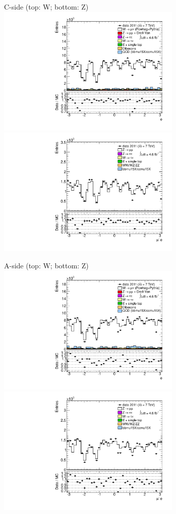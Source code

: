 {

\colb[T]

C-side (top: W; bottom: Z)
\centering
\includegraphics[width=0.66\textwidth]{dates/20130306/figures/etaphi/W_2_C_stack_l_phi_NEG} \\
\includegraphics[width=0.66\textwidth]{dates/20130306/figures/etaphi/Z_2_C_stack_lN_phi_ALL.pdf}

A-side (top: W; bottom: Z)
\centering
\includegraphics[width=0.66\textwidth]{dates/20130306/figures/etaphi/W_2_A_stack_l_phi_NEG} \\
\includegraphics[width=0.66\textwidth]{dates/20130306/figures/etaphi/Z_2_A_stack_lN_phi_ALL.pdf} 

\cole
}


